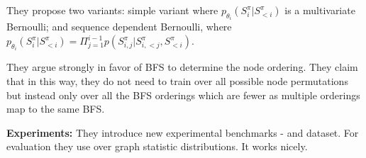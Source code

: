 They propose two variants: simple variant where $p_{\theta_i}(S^\pi_i |  S^\pi_{<i})$ is a multivariate Bernoulli; and sequence dependent Bernoulli, where $p_{\theta_i}(S^\pi_i |  S^\pi_{<i}) = \Pi_{j=1}^{i-1}p(S^\pi_{i, j} |  S^\pi_{i, <j}, S^\pi_{<i})$.

They argue strongly in favor of BFS to determine the node ordering.
They claim that in this way, they do not need to train over all possible node permutations but instead only over all the BFS orderings which are fewer as multiple orderings map to the same BFS. 

\textbf{Experiments:} They introduce new experimental benchmarks -  and  dataset.
For evaluation they use   over graph statistic distributions.
It works nicely.



